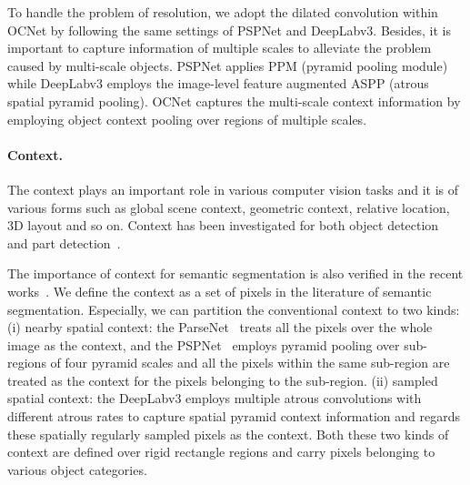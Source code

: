 \documentclass[10pt,twocolumn,letterpaper]{article}
\begin{document}
To handle the problem of resolution, we adopt the dilated convolution within OCNet by following the same settings of PSPNet and DeepLabv3.
Besides, it is important to capture information of multiple scales to alleviate the problem caused by multi-scale objects. PSPNet applies PPM (pyramid pooling module) while DeepLabv3 employs the image-level feature augmented ASPP (atrous spatial pyramid pooling).
OCNet captures the multi-scale context information by employing object context pooling over regions of multiple scales.

\paragraph{Context.}
The context plays an important role in various computer vision tasks and it is of various forms such as global scene context, geometric context, relative location, 3D layout and so on. 
Context has been investigated for both object detection~\cite{divvala2009empirical,Liu_2018_CVPR} and part detection~\cite{Gonzalez-Garcia_2018_CVPR}. 

The importance of context for semantic segmentation is also verified in the recent works~\cite{liu2015parsenet,zhao2017pyramid,chen2017rethinking}.
We define the context as a set of pixels in the literature of semantic segmentation.
Especially, we can partition the conventional context to two kinds:
(i) nearby spatial context: the ParseNet~\cite{liu2015parsenet} treats all the pixels over the whole image as the context, and the PSPNet~\cite{zhao2017pyramid} employs pyramid pooling over sub-regions of four pyramid scales and all the pixels within the same sub-region are treated as
the context for the pixels belonging to the sub-region.
(ii) sampled spatial context:  the DeepLabv3 employs multiple atrous convolutions with different atrous rates to capture spatial pyramid context information and regards these spatially regularly sampled pixels as the context.
Both these two kinds of context are defined over rigid rectangle regions and carry pixels belonging to various object categories.
\end{document}
